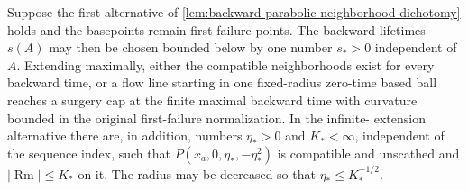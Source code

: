 \begin{lemma}
\label{lem:uniform-backward-lifetime}
\notready
Suppose the first alternative of
\ref{lem:backward-parabolic-neighborhood-dichotomy} holds and the basepoints
remain first-failure points.  The backward lifetimes $s(A)$ may then be
chosen bounded below by one number $s_*>0$ independent of $A$.  Extending
maximally, either the compatible neighborhoods exist for every backward
time, or a flow line starting in one fixed-radius zero-time based ball
reaches a surgery cap at the finite maximal backward time with curvature
bounded in the original first-failure normalization.  In the infinite-
extension alternative there are, in addition, numbers $\eta_*>0$ and
$K_*<\infty$, independent of the sequence index, such that
$P(x_a,0,\eta_*,-\eta_*^2)$ is compatible and unscathed and
$|\operatorname{Rm}|\le K_*$ on it.  The radius may be decreased so that
$\eta_*\le K_*^{-1/2}$.
\end{lemma}


